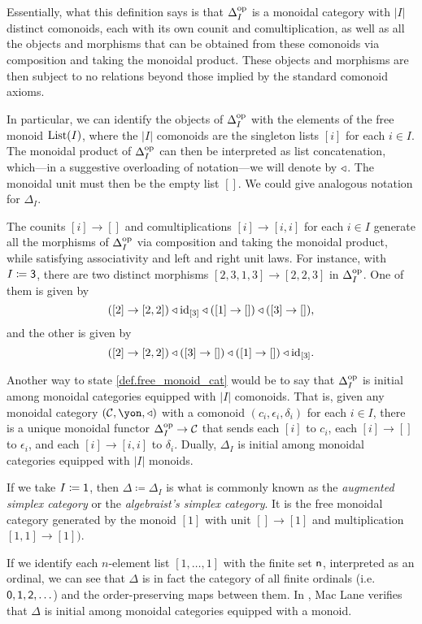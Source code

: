 \documentclass[Book-Poly]{subfiles}
\begin{document}
Essentially, what this definition says is that $\Delta_I^{\textnormal{op}}$ is a monoidal category with $|I|$ distinct comonoids, each with its own counit and comultiplication, as well as all the objects and morphisms that can be obtained from these comonoids via composition and taking the monoidal product.
These objects and morphisms are then subject to no relations beyond those implied by the standard comonoid axioms.

In particular, we can identify the objects of $\Delta_I^{\textnormal{op}}$ with the elements of the free monoid $\mathrm{List}(I)$, where the $|I|$ comonoids are the singleton lists $[i]$ for each $i \in I$.
The monoidal product of $\Delta_I^{\textnormal{op}}$ can then be interpreted as list concatenation, which---in a suggestive overloading of notation---we will denote by $\mathbin{\triangleleft}$.
The monoidal unit must then be the empty list $[]$.
We could give analogous notation for $\Delta_I$.

The counits $[i] \to []$ and comultiplications $[i] \to [i,i]$ for each $i \in I$ generate all the morphisms of $\Delta_I^{\textnormal{op}}$ via composition and taking the monoidal product, while satisfying associativity and left and right unit laws.
For instance, with $I \coloneqq \textsf{3}$, there are two distinct morphisms $[2,3,1,3] \to [2,2,3]$ in $\Delta_I^{\textnormal{op}}$. One of them is given by
\[
    ([2] \to [2,2]) \mathbin{\triangleleft} \mathrm{id}_{[3]} \mathbin{\triangleleft} ([1] \to []) \mathbin{\triangleleft} ([3] \to []),
\]
and the other is given by
\[
    ([2] \to [2,2]) \mathbin{\triangleleft} ([3] \to []) \mathbin{\triangleleft} ([1] \to []) \mathbin{\triangleleft} \mathrm{id}_{[3]}.
\]

Another way to state \cref{def.free_monoid_cat} would be to say that $\Delta_I^{\textnormal{op}}$ is initial among monoidal categories equipped with $|I|$ comonoids.
That is, given any monoidal category $(\cat{C}, \yon, \tri)$ with a comonoid $(c_i, \epsilon_i, \delta_i)$ for each $i \in I$, there is a unique monoidal functor $\Delta_I^{\textnormal{op}} \to \mathcal{C}$ that sends each $[i]$ to $c_i$, each $[i] \to []$ to $\epsilon_i$, and each $[i] \to [i,i]$ to $\delta_i$.
Dually, $\Delta_I$ is initial among monoidal categories equipped with $|I|$ monoids.

\begin{example}
If we take $I \coloneqq \textsf{1}$, then $\Delta \coloneqq \Delta_I$ is what is commonly known as the \emph{augmented simplex category} or the \emph{algebraist's simplex category}.
It is the free monoidal category generated by the monoid $[1]$ with unit $[] \to [1]$ and multiplication $[1,1] \to [1])$.

If we identify each $n$-element list $[1,\ldots,1]$ with the finite set $\mathsf{n}$, interpreted as an ordinal, we can see that $\Delta$ is in fact the category of all finite ordinals (i.e.\ $\textsf{0}, \textsf{1}, \textsf{2}, \ldots$) and the order-preserving maps between them.
In \cite[Chapter~VII, Section~8]{maclane}, Mac Lane verifies that $\Delta$ is initial among monoidal categories equipped with a monoid.
\end{example}
\end{document}
